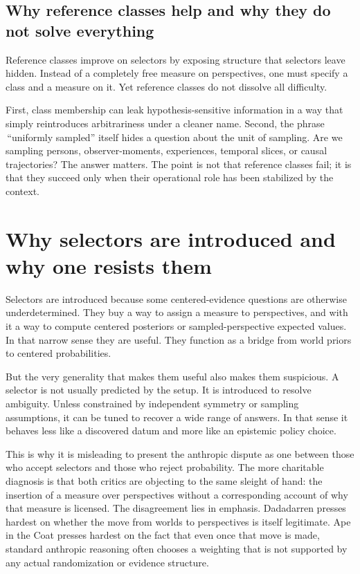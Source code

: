 \documentclass[11pt]{article}
\newcommand{\1}{\mathbf{1}}
\begin{document}
\subsection{Why reference classes help and why they do not solve everything}

Reference classes improve on selectors by exposing structure that selectors leave hidden. Instead of a completely free measure on perspectives, one must specify a class and a measure on it. Yet reference classes do not dissolve all difficulty.

First, class membership can leak hypothesis-sensitive information in a way that simply reintroduces arbitrariness under a cleaner name. Second, the phrase \,``uniformly sampled'' itself hides a question about the unit of sampling. Are we sampling persons, observer-moments, experiences, temporal slices, or causal trajectories? The answer matters. The point is not that reference classes fail; it is that they succeed only when their operational role has been stabilized by the context.

\section{Why selectors are introduced and why one resists them}

Selectors are introduced because some centered-evidence questions are otherwise underdetermined. They buy a way to assign a measure to perspectives, and with it a way to compute centered posteriors or sampled-perspective expected values. In that narrow sense they are useful. They function as a bridge from world priors to centered probabilities.

But the very generality that makes them useful also makes them suspicious. A selector is not usually predicted by the setup. It is introduced to resolve ambiguity. Unless constrained by independent symmetry or sampling assumptions, it can be tuned to recover a wide range of answers. In that sense it behaves less like a discovered datum and more like an epistemic policy choice.

This is why it is misleading to present the anthropic dispute as one between those who accept selectors and those who reject probability. The more charitable diagnosis is that both critics are objecting to the same sleight of hand: the insertion of a measure over perspectives without a corresponding account of why that measure is licensed. The disagreement lies in emphasis. Dadadarren presses hardest on whether the move from worlds to perspectives is itself legitimate. Ape in the Coat presses hardest on the fact that even once that move is made, standard anthropic reasoning often chooses a weighting that is not supported by any actual randomization or evidence structure.
\end{document}
